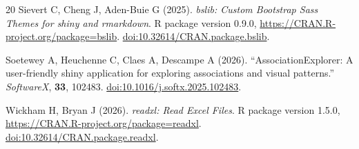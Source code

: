 \documentclass[11pt]{article}
\newcommand{\pkg}[1]{\textsf{#1}}
\newcommand{\proglang}[1]{\textsf{#1}}
\newcommand{\doi}[1]{\href{https://doi.org/#1}{doi:#1}}
\begin{document}
\begin{thebibliography}{20}
Sievert C, Cheng J, Aden-Buie G (2025).
\newblock \emph{\pkg{bslib}: Custom Bootstrap Sass Themes for \pkg{shiny} and \pkg{rmarkdown}}.
\newblock \proglang{R} package version 0.9.0,
\url{https://CRAN.R-project.org/package=bslib}.
\newblock \doi{10.32614/CRAN.package.bslib}.

Soetewey A, Heuchenne C, Claes A, Descampe A (2026).
\newblock ``AssociationExplorer: A user-friendly \pkg{shiny} application for
exploring associations and visual patterns.''
\newblock \emph{SoftwareX}, \textbf{33}, 102483.
\newblock \doi{10.1016/j.softx.2025.102483}.

Wickham H, Bryan J (2026).
\newblock \emph{\pkg{readxl}: Read Excel Files}.
\newblock \proglang{R} package version 1.5.0,
\url{https://CRAN.R-project.org/package=readxl}.
\newblock \doi{10.32614/CRAN.package.readxl}.

\end{thebibliography}

\newpage
\end{document}
